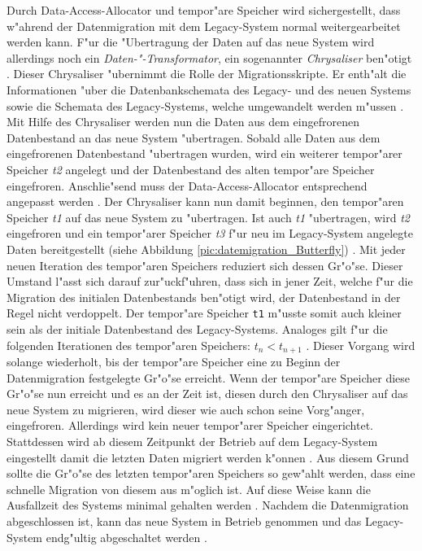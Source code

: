 Durch Data-Access-Allocator und tempor"are Speicher wird sichergestellt, dass w"ahrend der Datenmigration mit dem Legacy-System normal weitergearbeitet werden kann. F"ur die "Ubertragung der Daten auf das neue System wird allerdings noch ein \textit{Daten-"-Transformator}, ein sogenannter \textit{Chrysaliser} ben"otigt \citep[S.~202]{wuLawlessBisbal-1997}. Dieser Chrysaliser "ubernimmt die Rolle der Migrationsskripte. Er enth"alt die Informationen "uber die Datenbankschemata des Legacy- und des neuen Systems sowie die Schemata des Legacy-Systems, welche umgewandelt werden m"ussen \citep[S.~202]{wuLawlessBisbal-1997}. 
\lb
Mit Hilfe des Chrysaliser werden nun die Daten aus dem eingefrorenen Datenbestand an das neue System "ubertragen. Sobald alle Daten aus dem eingefrorenen Datenbestand "ubertragen wurden, wird ein weiterer tempor"arer Speicher \textit{t2} angelegt und der Datenbestand des alten tempor"are Speicher eingefroren. Anschlie"send muss der Data-Access-Allocator entsprechend angepasst werden \citep[S.~202]{wuLawlessBisbal-1997}. Der Chrysaliser kann nun damit beginnen, den tempor"aren Speicher \textit{t1} auf das neue System zu "ubertragen. Ist auch \textit{t1} "ubertragen, wird \textit{t2} eingefroren und ein tempor"arer Speicher \textit{t3} f"ur neu im Legacy-System angelegte Daten bereitgestellt (siehe Abbildung \ref{pic:datemigration_Butterfly}) \citep[S.~202]{wuLawlessBisbal-1997}. Mit jeder neuen Iteration des tempor"aren Speichers reduziert sich dessen Gr"o"se. Dieser Umstand l"asst sich darauf zur"uckf"uhren, dass sich in jener Zeit, welche f"ur die Migration des initialen Datenbestands ben"otigt wird, der Datenbestand in der Regel nicht verdoppelt. Der tempor"are Speicher \texttt{t1} m"usste somit auch kleiner sein als der initiale Datenbestand des Legacy-Systems. Analoges gilt f"ur die folgenden Iterationen des tempor"aren Speichers: \textit{$t_n <t_{n+1}$} \citep[S.~202]{wuLawlessBisbal-1997}. 
\lb
Dieser Vorgang wird solange wiederholt, bis der tempor"are Speicher eine zu Beginn der Datenmigration festgelegte Gr"o"se erreicht. Wenn der tempor"are Speicher diese Gr"o"se nun erreicht und es an der Zeit ist, diesen durch den Chrysaliser auf das neue System zu migrieren, wird dieser wie auch schon seine Vorg"anger, eingefroren. Allerdings wird kein neuer tempor"arer Speicher eingerichtet. Stattdessen wird ab diesem Zeitpunkt der Betrieb auf dem Legacy-System eingestellt damit die letzten Daten migriert werden k"onnen \citep[S.~202]{wuLawlessBisbal-1997}. Aus diesem Grund sollte die Gr"o"se des letzten tempor"aren Speichers so gew"ahlt werden, dass eine schnelle Migration von diesem aus m"oglich ist. Auf diese Weise kann die Ausfallzeit des Systems minimal gehalten werden \citep[S.~202]{wuLawlessBisbal-1997}. Nachdem die Datenmigration abgeschlossen ist, kann das neue System in Betrieb genommen und das Legacy-System endg"ultig abgeschaltet werden \citep[S.~204]{wuLawlessBisbal-1997}.
